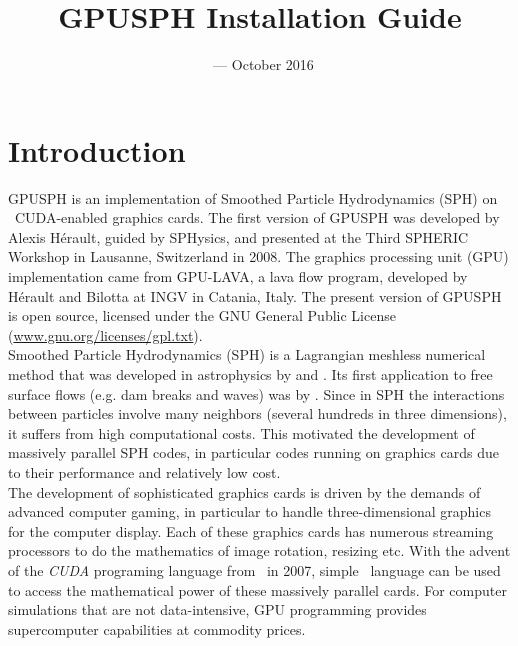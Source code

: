 \documentclass{../GPUSPHtemplate}
\title{GPUSPH Installation Guide}
\author{}
\date{\currentver\ --- October 2016}
\begin{document}
\maketitle
\tableofcontents
\newpage

\section{Introduction}

GPUSPH is an implementation of Smoothed Particle Hydrodynamics (SPH) on
\nvidia\ CUDA-enabled graphics cards. The first version of GPUSPH was
developed by Alexis Hérault, guided by SPHysics, and presented at the
Third SPHERIC Workshop in Lausanne, Switzerland in 2008. 
The graphics processing unit (GPU) implementation came from GPU-LAVA, 
a lava flow program, developed by Hérault and Bilotta at INGV in 
Catania, Italy. The present version of GPUSPH is open source, 
licensed under the GNU General Public License
(\url{www.gnu.org/licenses/gpl.txt}). \\

Smoothed Particle Hydrodynamics (SPH) is a Lagrangian meshless numerical
method that was developed in astrophysics by \cite{lucy_numerical_1977} and
\cite{gingold_smoothed_1977}. Its first application to free surface flows (e.g.
dam breaks and waves) was by \cite{monaghan_volcanoes_1994}.
Since in SPH the interactions between particles involve many neighbors
(several hundreds in three dimensions), it suffers from high computational costs.
This motivated the development of massively parallel SPH codes,
in particular codes running on graphics cards due to their performance and relatively
low cost.\\

The development of sophisticated graphics cards is driven by the demands of 
advanced computer gaming, in particular to handle three-dimensional 
graphics for the computer display. Each of these
graphics cards has numerous streaming processors to do the mathematics
of image rotation, resizing etc. With the advent of the {\em CUDA}
programing language from \nvidia\ in 2007, simple \cpp\ language can be used
to access the mathematical power of these massively parallel cards. For
computer simulations that are not data-intensive, GPU programming
provides supercomputer capabilities at commodity prices.\\
\end{document}
